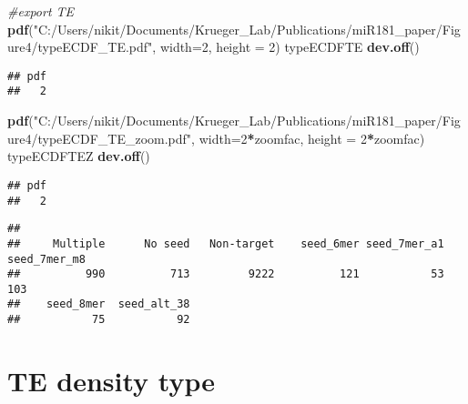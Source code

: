 \documentclass[
]{article}
\newenvironment{Shaded}{\begin{snugshade}}{\end{snugshade}}
\newcommand{\AttributeTok}[1]{\textcolor[rgb]{0.13,0.29,0.53}{#1}}
\newcommand{\CommentTok}[1]{\textcolor[rgb]{0.56,0.35,0.01}{\textit{#1}}}
\newcommand{\DecValTok}[1]{\textcolor[rgb]{0.00,0.00,0.81}{#1}}
\newcommand{\FunctionTok}[1]{\textcolor[rgb]{0.13,0.29,0.53}{\textbf{#1}}}
\newcommand{\NormalTok}[1]{#1}
\newcommand{\SpecialCharTok}[1]{\textcolor[rgb]{0.81,0.36,0.00}{\textbf{#1}}}
\newcommand{\StringTok}[1]{\textcolor[rgb]{0.31,0.60,0.02}{#1}}
\begin{document}
\begin{Shaded}
\begin{Highlighting}[]
\CommentTok{\#export TE}
\FunctionTok{pdf}\NormalTok{(}\StringTok{"C:/Users/nikit/Documents/Krueger\_Lab/Publications/miR181\_paper/Figure4/typeECDF\_TE.pdf"}\NormalTok{, }\AttributeTok{width=}\DecValTok{2}\NormalTok{, }\AttributeTok{height =} \DecValTok{2}\NormalTok{)}
\NormalTok{typeECDFTE}
\FunctionTok{dev.off}\NormalTok{()}
\end{Highlighting}
\end{Shaded}

\begin{verbatim}
## pdf 
##   2
\end{verbatim}

\begin{Shaded}
\begin{Highlighting}[]
\FunctionTok{pdf}\NormalTok{(}\StringTok{"C:/Users/nikit/Documents/Krueger\_Lab/Publications/miR181\_paper/Figure4/typeECDF\_TE\_zoom.pdf"}\NormalTok{, }\AttributeTok{width=}\DecValTok{2}\SpecialCharTok{*}\NormalTok{zoomfac, }\AttributeTok{height =} \DecValTok{2}\SpecialCharTok{*}\NormalTok{zoomfac)}
\NormalTok{typeECDFTEZ}
\FunctionTok{dev.off}\NormalTok{()}
\end{Highlighting}
\end{Shaded}

\begin{verbatim}
## pdf 
##   2
\end{verbatim}

\begin{Shaded}
\end{Shaded}

\begin{verbatim}
## 
##     Multiple      No seed   Non-target    seed_6mer seed_7mer_a1 seed_7mer_m8 
##          990          713         9222          121           53          103 
##    seed_8mer  seed_alt_38 
##           75           92
\end{verbatim}

\hypertarget{te-density-type}{%
\section{TE density type}\label{te-density-type}}
\end{document}
